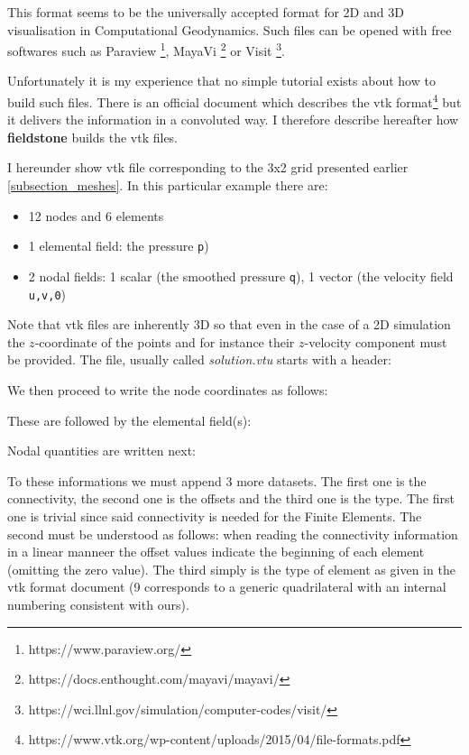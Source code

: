 \documentclass[a4paper]{article}
\newcommand{\fieldstone}{{\bf fieldstone}}
\begin{document}
This format seems to be the universally accepted format for 2D and 3D visualisation in 
Computational Geodynamics. Such files can be opened with free softwares such as 
Paraview \footnote{https://www.paraview.org/}, MayaVi \footnote{https://docs.enthought.com/mayavi/mayavi/}
or Visit \footnote{https://wci.llnl.gov/simulation/computer-codes/visit/}.

Unfortunately it is my experience that no simple tutorial exists about how to build 
such files. There is an official document which describes the vtk 
format\footnote{https://www.vtk.org/wp-content/uploads/2015/04/file-formats.pdf}
but it delivers the information in a convoluted way. I therefore describe hereafter 
how \fieldstone{} builds the vtk files. 

I hereunder show vtk file corresponding to the 3x2 grid presented earlier \ref{subsection_meshes}.
In this particular example there are:
\begin{itemize}
\item 12 nodes and 6 elements
\item 1 elemental field: the pressure {\tt p})
\item 2 nodal fields: 1 scalar (the smoothed pressure {\tt q}), 1 vector (the velocity field {\tt u,v,0})
\end{itemize}
Note that vtk files are inherently 3D so that even in the case of a 2D simulation the $z$-coordinate 
of the points and for instance their $z$-velocity component must be provided.
The file, usually called {\sl solution.vtu} starts with a header:



We then proceed to write the node coordinates as follows:



These are followed by the elemental field(s):



Nodal quantities are written next:



To these informations we must append 3 more datasets. The first one is the connectivity, 
the second one is the offsets and the third one is the type. The first one is trivial
since said connectivity is needed for the Finite Elements. The second must be understood as follows:
when reading the connectivity information in a linear manneer the offset values 
indicate the beginning of each element (omitting the zero value). The third simply is the type of element 
as given in the vtk format document (9 corresponds to a generic quadrilateral with an 
internal numbering consistent with ours). 
\end{document}
